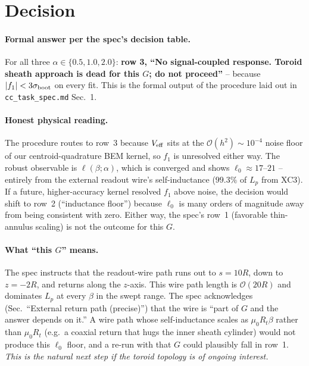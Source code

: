 \documentclass[11pt]{article}
\begin{document}
\section{Decision}
\label{sec:decision}

\paragraph{Formal answer per the spec's decision table.}

For all three $\alpha\in\{0.5,1.0,2.0\}$: \textbf{row 3, ``No
signal-coupled response.  Toroid sheath approach is dead for this $G$;
do not proceed''} -- because $|f_1|<3\sigma_{\rm boot}$ on every fit.
This is the formal output of the procedure laid out in
\texttt{cc\_task\_spec.md} Sec.~1.

\paragraph{Honest physical reading.}

The procedure routes to row~3 because $V_{\rm eff}$ sits at the
$\mathcal O(h^2)\sim 10^{-4}$ noise floor of our centroid-quadrature
BEM kernel, so $f_1$ is unresolved either way.  The robust observable
is $\ell(\beta;\alpha)$, which is converged and shows
$\ell_0\approx 17$--$21$ -- entirely from the external readout wire's
self-inductance ($99.3\%$ of $L_p$ from XC3).  If a future,
higher-accuracy kernel resolved $f_1$ above noise, the decision would
shift to row~2 (``inductance floor'') because $\ell_0$ is many orders
of magnitude away from being consistent with zero.  Either way, the
spec's row~1 (favorable thin-annulus scaling) is not the outcome for
this $G$.

\paragraph{What ``this $G$'' means.}

The spec instructs that the readout-wire path runs out to $s=10R$,
down to $z=-2R$, and returns along the $z$-axis.  This wire path
length is $\mathcal O(20 R)$ and dominates $L_p$ at every $\beta$
in the swept range.  The spec acknowledges (Sec.~``External return
path (precise)'') that the wire is ``part of $G$ and the answer
depends on it.''  A wire path whose self-inductance scales as
$\mu_0 R_t\beta$ rather than $\mu_0 R_t$ (e.g.\ a coaxial return that
hugs the inner sheath cylinder) would not produce this $\ell_0$
floor, and a re-run with that $G$ could plausibly fall in row~1.
\emph{This is the natural next step if the toroid topology is of
ongoing interest.}
\end{document}
